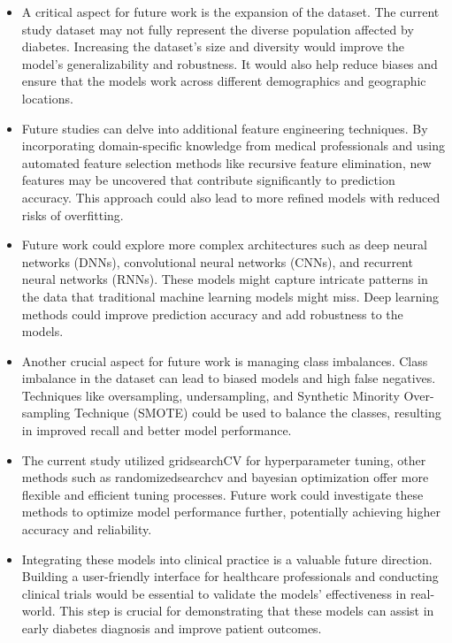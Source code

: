 \begin{itemize}
\item A critical aspect for future work is the expansion of the dataset. The current study dataset may not fully represent the diverse population affected by diabetes. Increasing the dataset's size and diversity would improve the model's generalizability and robustness. It would also help reduce biases and ensure that the models work across different demographics and geographic locations.

\item Future studies can delve into additional feature engineering techniques. By incorporating domain-specific knowledge from medical professionals and using automated feature selection methods like recursive feature elimination, new features may be uncovered that contribute significantly to prediction accuracy. This approach could also lead to more refined models with reduced risks of overfitting.

\item Future work could explore more complex architectures such as deep neural networks (DNNs), convolutional neural networks (CNNs), and recurrent neural networks (RNNs). These models might capture intricate patterns in the data that traditional machine learning models might miss. Deep learning methods could improve prediction accuracy and add robustness to the models.

\item Another crucial aspect for future work is managing class imbalances. Class imbalance in the dataset can lead to biased models and high false negatives. Techniques like oversampling, undersampling, and Synthetic Minority Over-sampling Technique (SMOTE) could be used to balance the classes, resulting in improved recall and better model performance.

\item The current study utilized gridsearchCV for hyperparameter tuning, other methods such as randomizedsearchcv and bayesian optimization offer more flexible and efficient tuning processes. Future work could investigate these methods to optimize model performance further, potentially achieving higher accuracy and reliability.

\item Integrating these models into clinical practice is a valuable future direction. Building a user-friendly interface for healthcare professionals and conducting clinical trials would be essential to validate the models' effectiveness in real-world. This step is crucial for demonstrating that these models can assist in early diabetes diagnosis and improve patient outcomes.
\end{itemize}
